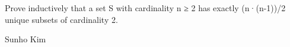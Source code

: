 Prove inductively that a set S with cardinality n ≥ 2 has exactly (n·(n-1))/2 unique subsets of cardinality 2.

Sunho Kim